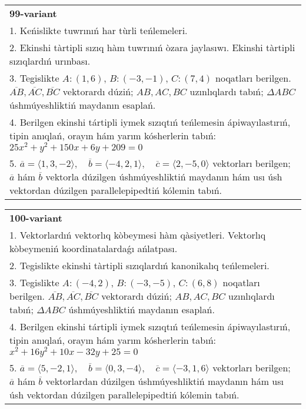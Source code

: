 \documentclass{article}
\begin{document}
\begin{tabular}{m{17cm}}
\textbf{99-variant}\\
1. Keńislikte tuwrınıń har tùrli teńlemeleri. \\

2. Ekinshi tàrtipli sızıq hàm tuwrınıń òzara jaylasıwı. Ekinshi tàrtipli sızıqlardıń urınbası.\\

3. Tegislikte $A: (1, 6)$, $B: (-3, -1)$, $C: (7, 4)$ noqatları berilgen. $\overline{AB}, \overline{AC}, \overline{BC}$ vektorardı dúziń; $AB, AC, BC$ uzınlıqlardı tabıń; $\Delta ABC$ úshmúyeshliktiń maydanın esaplań. \\

4. Berilgen ekinshi tártipli iymek sızıqtıń teńlemesin ápiwayılastırıń, tipin anıqlań, orayın hám yarım kósherlerin tabıń: $25x^2+y^2+150x+6y+209=0$\\

5. \(\overline{a} = \langle 1, 3, -2 \rangle, \quad \overline{b} = \langle -4, 2, 1 \rangle, \quad \overline{c} = \langle 2, -5, 0 \rangle\) vektorları berilgen; \(\overline{a}\) hám \(\overline{b}\) vektorla dúzilgen úshmúyeshliktiń maydanın hám usı úsh vektordan dúzilgen parallelepipedtiń kólemin tabıń.
\end{tabular}
\vspace{1cm}


\begin{tabular}{m{17cm}}
\textbf{100-variant}\\
1. Vektorlardıń vektorlıq kòbeymesi hàm qàsiyetleri. Vektorlıq kòbeymeniń koordinatalardaǵı ańlatpası. \\

2. Tegislikte ekinshi tàrtipli sızıqlardıń kanonikalıq teńlemeleri.\\

3. Tegislikte $A: (-4, 2)$, $B: (-3, -5)$, $C: (6, 8)$ noqatları berilgen. $\overline{AB}, \overline{AC}, \overline{BC}$ vektorardı dúziń; $AB, AC, BC$ uzınlıqlardı tabıń; $\Delta ABC$ úshmúyeshliktiń maydanın esaplań. \\

4. Berilgen ekinshi tártipli iymek sızıqtıń teńlemesin ápiwayılastırıń, tipin anıqlań, orayın hám yarım kósherlerin tabıń: $x^2+16y^2+10x-32y+25=0$\\

5. \(\overline{a} = \langle 5, -2, 1 \rangle, \quad \overline{b} = \langle 0, 3, -4 \rangle, \quad \overline{c} = \langle -3, 1, 6 \rangle\) vektorları berilgen; \(\overline{a}\) hám \(\overline{b}\) vektorlardan dúzilgen úshmúyeshliktiń maydanın hám usı úsh vektordan dúzilgen parallelepipedtiń kólemin tabıń.
\end{tabular}
\vspace{1cm}
\end{document}
